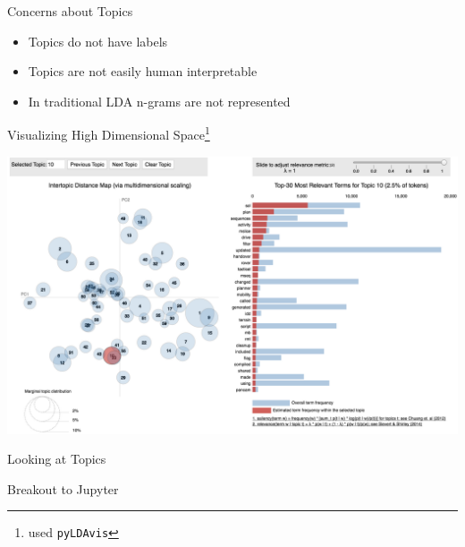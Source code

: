\documentclass[10pt]{beamer}
\begin{document}
\begin{frame}{Concerns about Topics}
  \begin{itemize}
  \item Topics do not have labels
  \item Topics are not easily human interpretable
  \item In traditional LDA n-grams are not represented
  \end{itemize}
\end{frame}

\begin{frame}{Visualizing High Dimensional Space\footnote{used \texttt{pyLDAvis}}}

    \includegraphics[width=\textwidth]{LDAvis.png}

\end{frame}

\begin{frame}{Looking at Topics}

  {\centering Breakout to Jupyter}
\end{frame}
\end{document}
